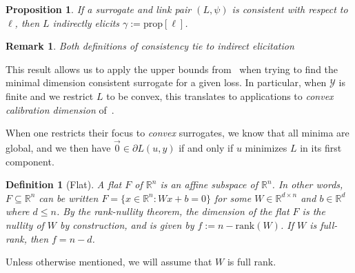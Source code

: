 \documentclass{article}
\newcommand{\reals}{\mathbb{R}}
\newcommand{\simplex}{\Delta_\Y}
\newcommand{\prop}[1]{\mathrm{prop}[#1]}
\newcommand{\Y}{\mathcal{Y}}
\newcommand{\inprod}[2]{\langle #1, #2 \rangle}
\newtheorem{theorem}{Theorem}
\newtheorem{proposition}{Proposition}
\newtheorem{corollary}{Corollary}
\newtheorem{definition}{Definition}
\newtheorem{remark}{Remark}
\DeclareMathOperator*{\arginf}{arg\,inf}
\begin{document}
\begin{proposition}\label{prop:consistent-implies-indir-elic}
	If a surrogate and link pair $(L, \psi)$ is consistent with respect to $\ell$, then $L$ indirectly elicits $\gamma := \prop{\ell}$.
\end{proposition}


\begin{remark}
	Both definitions of consistency tie to indirect elicitation
\end{remark}

This result allows us to apply the upper bounds from~\cite{frongillo2015elicitation} when trying to find the minimal dimension consistent surrogate for a given loss.
In particular, when $\Y$ is finite and we restrict $L$ to be convex, this translates to applications to \emph{convex calibration dimension} of~\cite{ramaswamy2016convex}.


When one restricts their focus to \emph{convex} surrogates, we know that all minima are global, and we then have $\vec 0  \in \partial L(u, y)$ if and only if $u$ minimizes $L$ in its first component.

%

\begin{definition}[Flat]
	A \emph{flat} $F$ of $\reals^n$ is an affine subspace of $\reals^n$.
	In other words, $F\subseteq \reals^n$ can be written $F=\{x\in\reals^n : Wx + b = 0\}$ for some $W\in\reals^{d\times n}$ and $b\in\reals^d$ where $d\leq n$.
	By the rank-nullity theorem, the dimension of the flat $F$ is the nullity of $W$ by construction, and is given by $f := n - \mathrm{rank}(W)$.
	If $W$ is full-rank, then $f = n - d$.
\end{definition}
Unless otherwise mentioned, we will assume that $W$ is full rank.
\end{document}

